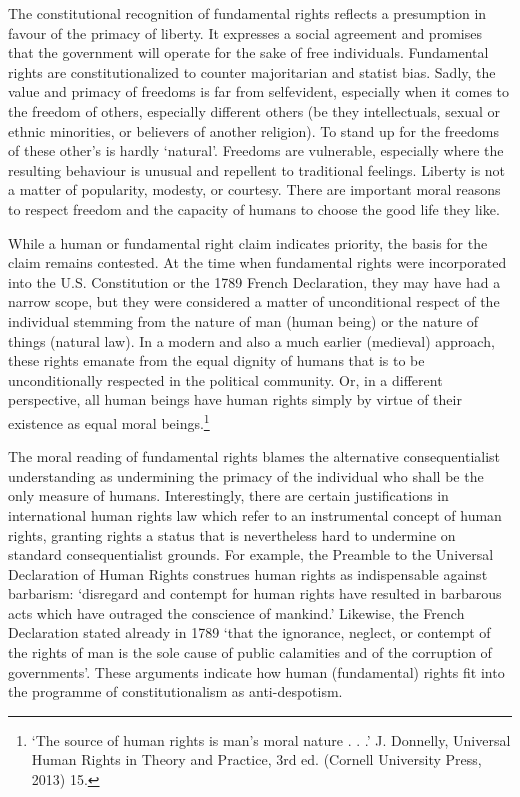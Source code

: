 \begin{multicols}{2}
\vspace{-.1cm}

\noi
The constitutional recognition of fundamental rights reflects a presumption in favour of the
primacy of liberty. It expresses a social agreement and promises that the government will
operate for the sake of free individuals. Fundamental rights are constitutionalized to counter
majoritarian and statist bias. Sadly, the value and primacy of freedoms is far from selfevident, especially when it comes to the freedom of others, especially different others (be
they intellectuals, sexual or ethnic minorities, or believers of another religion). To stand up
for the freedoms of these other’s is hardly ‘natural’. Freedoms are vulnerable, especially
where the resulting behaviour is unusual and repellent to traditional feelings. Liberty is not a
matter of popularity, modesty, or courtesy. There are important moral reasons to respect
freedom and the capacity of humans to choose the good life they like. 

\vspace{-.1cm}

\noi
While a human or fundamental right claim indicates priority, the basis for the claim remains
contested. At the time when fundamental rights were incorporated into the U.S. Constitution
or the 1789 French Declaration, they may have had a narrow scope, but they were considered
a matter of unconditional respect of the individual stemming from the nature of man (human being) or the nature of things (natural law). In a modern and also a much earlier (medieval)
approach, these rights emanate from the equal dignity of humans that is to be unconditionally
respected in the political community. Or, in a different perspective, all human beings have
human rights simply by virtue of their existence as equal moral beings.\footnote{‘The source of human rights is man’s moral nature . . .’ J. Donnelly, Universal Human Rights in Theory and
Practice, 3rd ed. (Cornell University Press, 2013) 15.}

\noi
The moral reading of fundamental rights blames the alternative consequentialist
understanding as undermining the primacy of the individual who shall be the only measure of
humans. Interestingly, there are certain justifications in international human rights law which
refer to an instrumental concept of human rights, granting rights a status that is nevertheless
hard to undermine on standard consequentialist grounds. For example, the Preamble to the
Universal Declaration of Human Rights construes human rights as indispensable against
barbarism: ‘disregard and contempt for human rights have resulted in barbarous acts which
have outraged the conscience of mankind.’ Likewise, the French Declaration stated already in
1789 ‘that the ignorance, neglect, or contempt of the rights of man is the sole cause of public
calamities and of the corruption of governments’. These arguments indicate how human
(fundamental) rights fit into the programme of constitutionalism as anti-despotism.



\end{multicols}
